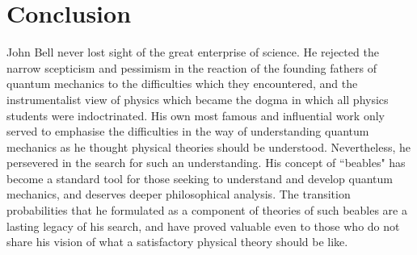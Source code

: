 \documentclass[12pt,reqno]{article}
\renewcommand{\(}{\left(}
\renewcommand{\)}{\right)}
\renewcommand{\.}{\centerdot}
\newcommand{\1}{\mathbf{1}}
\newcommand{\<}{\langle}
\renewcommand{\>}{\rangle}
\theoremstyle{definition}
\theoremstyle{remark}
\numberwithin{equation}{section}
\begin{document}
\section{Conclusion}

John Bell never lost sight of the great enterprise of science. He rejected the narrow scepticism and pessimism in the reaction of the founding fathers of quantum mechanics to the difficulties which they encountered, and the instrumentalist view of physics which became the dogma in which all physics students were indoctrinated. His own most famous and influential work only served to emphasise the difficulties in the way of understanding quantum mechanics as he thought physical theories should be understood. Nevertheless, he persevered in the search for such an understanding. His concept of ``beables" has become a standard tool for those seeking to understand and develop quantum mechanics, and deserves deeper philosophical analysis. The transition probabilities that he formulated as a component of theories of such beables are a lasting legacy of his search, and have proved valuable even to those who do not share his vision of what a satisfactory physical theory should be like. 


%
%
\end{document}
